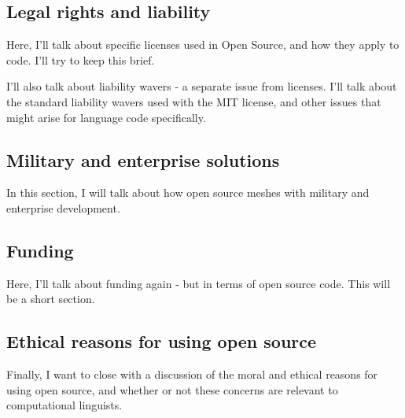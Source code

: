 \subsection{Legal rights and liability}

Here, I'll talk about specific licenses used in Open Source, and how they apply to code. I'll try to keep this brief.

I'll also talk about liability wavers - a separate issue from licenses. I'll talk about the standard liability wavers used with the MIT license, and other issues that might arise for language code specifically.

\subsection{Military and enterprise solutions}

In this section, I will talk about how open source meshes with military and enterprise development.


\subsection{Funding}

Here, I'll talk about funding again - but in terms of open source code. This will be a short section.




\subsection{Ethical reasons for using open source}

Finally, I want to close with a discussion of the moral and ethical reasons for using open source, and whether or not these concerns are relevant to computational linguists.
